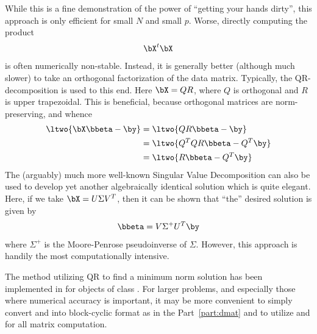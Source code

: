 While this is a fine demonstration of the power of ``getting your hands dirty'', this approach is only efficient for small $N$ and small $p$.  Worse, directly computing the product
\begin{align*}
\bX^t\bX
\end{align*}
is often numerically non-stable.  Instead, it is generally better (although much slower) to take an orthogonal factorization of the data matrix.  Typically, the QR-decomposition is used to this end.  Here $\bX=QR$, where $Q$ is orthogonal and $R$ is upper trapezoidal.  This is beneficial, because orthogonal matrices are norm-preserving, and whence
\begin{align*}
\ltwo{\bX\bbeta - \by} &= \ltwo{QR\bbeta - \by}\\
  &= \ltwo{Q^TQR\bbeta - Q^T\by}\\
  &= \ltwo{R\bbeta - Q^T\by}
\end{align*}
The (arguably) much more well-known Singular Value Decomposition can also be used to develop yet another algebraically identical solution which is quite elegant.  Here, if we take $\bX = U\Sigma V^T$, then it can be shown that ``the'' desired solution is given by
\begin{align*}
\bbeta = V\Sigma^+ U^T\by
\end{align*}
where $\Sigma^+$ is the Moore-Penrose pseudoinverse of $\Sigma$.  However, this approach is handily the most computationally intensive.

The method utilizing QR to find a minimum norm solution has been implemented in  for objects of class .  For larger problems, and especially those where numerical accuracy is important, it may be more convenient to simply convert  and  into block-cyclic format as in the Part~\ref{part:dmat} and
to utilize  and  for all matrix computation.

